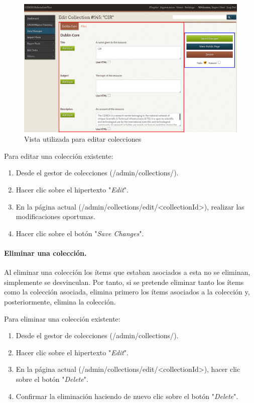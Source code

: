 \documentclass[
]{article}
\providecommand{\tightlist}{%
  \setlength{\itemsep}{0pt}\setlength{\parskip}{0pt}}
\begin{document}
\begin{figure}
\hypertarget{edit-collections-view}{%
\centering
\includegraphics{../_static/images/edit-collections-view.png}
\caption{Vista utilizada para editar
colecciones}\label{edit-collections-view}
}
\end{figure}

Para editar una colección existente:

\begin{enumerate}
\def\labelenumi{\arabic{enumi}.}
\tightlist
\item
  Desde el gestor de colecciones ({/admin/collections/}).
\item
  Hacer clic sobre el hipertexto "\emph{Edit}".
\item
  En la página actual
  ({/admin/collections/edit/\textless collectionId\textgreater{}}),
  realizar las modificaciones oportunas.
\item
  Hacer clic sobre el botón "\emph{Save Changes}".
\end{enumerate}

\hypertarget{eliminar-una-colecciuxf3n.}{%
\paragraph{Eliminar una colección.}\label{eliminar-una-colecciuxf3n.}}

Al eliminar una colección los ítems que estaban asociados a esta no se
eliminan, simplemente se desvinculan. Por tanto, si se pretende eliminar
tanto los ítems como la colección asociada, elimina primero los ítems
asociados a la colección y, posteriormente, elimina la colección.

Para eliminar una colección existente:

\begin{enumerate}
\def\labelenumi{\arabic{enumi}.}
\tightlist
\item
  Desde el gestor de colecciones ({/admin/collections/}).
\item
  Hacer clic sobre el hipertexto "\emph{Edit}".
\item
  En la página actual
  ({/admin/collections/edit/\textless collectionId\textgreater{}}),
  hacer clic sobre el botón "\emph{Delete}".
\item
  Confirmar la eliminación haciendo de nuevo clic sobre el botón
  "\emph{Delete}".
\end{enumerate}
\end{document}
